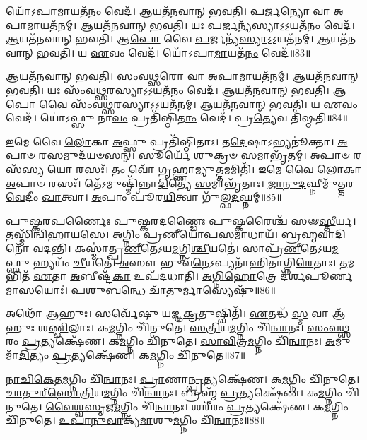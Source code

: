 𑌯𑍋᳴𑌽𑌪𑌾\-\ul{𑌮𑌾}\-𑌯𑌤᳴\-\ul{𑌨𑌂} 𑌵𑍇𑌦᳴। \ul{𑌆}\-𑌯𑌤᳴𑌨𑌵𑌾𑌨𑍍‌ 𑌭𑌵𑌤𑌿।
\-\ul{𑌪}\-𑌰𑍍𑌜\-\ul{𑌨𑍍𑌯𑍋} 𑌵𑌾 \ul{𑌅}\-𑌪𑌾\-\ul{𑌮𑌾}\-𑌯𑌤᳴𑌨𑌮𑍍। \ul{𑌆}\-𑌯𑌤᳴𑌨𑌵𑌾𑌨𑍍‌ 𑌭𑌵𑌤𑌿। 
𑌯𑌃 \ul{𑌪}\-𑌰𑍍𑌜𑌨𑍍𑌯᳴\-\ul{𑌸𑍍𑌯𑌾}\-𑌽॒𑌽॒𑌯𑌤᳴\-\ul{𑌨𑌂} 𑌵𑍇𑌦᳴। \ul{𑌆}\-𑌯𑌤᳴𑌨𑌵𑌾𑌨𑍍‌ 𑌭𑌵𑌤𑌿। 
𑌆\-\ul{𑌪𑍋} 𑌵𑍈 \ul{𑌪}\-𑌰𑍍𑌜𑌨𑍍𑌯᳴\-\ul{𑌸𑍍𑌯𑌾}\-𑌽॒𑌽॒𑌯𑌤᳴𑌨𑌮𑍍। \ul{𑌆}\-𑌯𑌤᳴𑌨𑌵𑌾𑌨𑍍‌ 𑌭𑌵𑌤𑌿। 
𑌯 \ul{𑌏}\-𑌵𑌂 𑌵𑍇𑌦᳴। 𑌯𑍋᳴𑌽𑌪𑌾\-\ul{𑌮𑌾}\-𑌯𑌤᳴\-\ul{𑌨𑌂} 𑌵𑍇𑌦᳴॥83॥


\-\ul{𑌆}\-𑌯𑌤᳴𑌨𑌵𑌾𑌨𑍍‌ 𑌭𑌵𑌤𑌿। \ul{𑌸𑌂}\-\-\ul{𑌵}\-\-\ul{𑌥𑍍𑌸}\-𑌰𑍋 𑌵𑌾 \ul{𑌅}\-𑌪𑌾\-\ul{𑌮𑌾}\-𑌯𑌤᳴𑌨𑌮𑍍। 
\-\ul{𑌆}\-𑌯𑌤᳴𑌨𑌵𑌾𑌨𑍍‌ 𑌭𑌵𑌤𑌿। 𑌯𑌃 𑌸𑌂᳴𑌵\-\ul{𑌥𑍍𑌸}\-𑌰\-\ul{𑌸𑍍𑌯𑌾}\-𑌽॒𑌽॒𑌯𑌤᳴\-\ul{𑌨𑌂} 𑌵𑍇𑌦᳴। 
\-\ul{𑌆}\-𑌯𑌤᳴𑌨𑌵𑌾𑌨𑍍‌ 𑌭𑌵𑌤𑌿। 𑌆\-\ul{𑌪𑍋} 𑌵𑍈 𑌸𑌂᳴𑌵\-\ul{𑌥𑍍𑌸}\-𑌰\-\ul{𑌸𑍍𑌯𑌾}\-𑌽॒𑌽॒𑌯𑌤᳴𑌨𑌮𑍍। 
\-\ul{𑌆}\-𑌯𑌤᳴𑌨𑌵𑌾𑌨𑍍‌ 𑌭𑌵𑌤𑌿। 𑌯 \ul{𑌏}\-𑌵𑌂 𑌵𑍇𑌦᳴। 
𑌯𑍋॑𑌽𑌫𑍍𑌸𑍁 𑌨𑌾\-\ul{𑌵𑌂} 𑌪𑍍𑌰𑌤𑌿᳴𑌷𑍍𑌠𑌿\-\ul{𑌤𑌾𑌂} 𑌵𑍇𑌦᳴। 𑌪𑍍𑌰\-\ul{𑌤𑍍𑌯𑍇}\-𑌵 𑌤𑌿᳴𑌷𑍍𑌠𑌤𑌿॥84॥


\-\ul{𑌇}\-𑌮𑍇 𑌵𑍈 \ul{𑌲𑍋}\-𑌕𑌾 \ul{𑌅}\-𑌫𑍍𑌸𑍁 𑌪𑍍𑌰𑌤𑌿᳴𑌷𑍍𑌠𑌿𑌤𑌾𑌃। 𑌤\-\ul{𑌦𑍇}\-𑌷𑌾𑌽𑌭𑍍𑌯𑌨𑍂॑𑌕𑍍𑌤𑌾। 
\-\ul{𑌅}\-𑌪𑌾𑍞 𑌰\-\ul{𑌸}\-𑌮𑍁𑌦᳴𑌯𑍞𑌸𑌨𑍍। 𑌸𑍂𑌰𑍍𑌯𑍇᳴ \ul{𑌶𑍁}\-𑌕𑍍𑌰𑍞 \ul{𑌸}\-𑌮𑌾𑌭𑍃᳴𑌤𑌮𑍍। 
\-\ul{𑌅}\-𑌪𑌾𑍞 𑌰𑌸᳴\-\ul{𑌸𑍍𑌯} 𑌯𑍋 𑌰𑌸𑌃᳴। 𑌤𑌂 𑌵𑍋᳴ 𑌗𑍃𑌹𑍍𑌣𑌾𑌮𑍍𑌯𑍁\-\ul{𑌤𑍍𑌤}\-𑌮𑌮𑌿𑌤𑌿᳴। 
\-\ul{𑌇}\-𑌮𑍇 𑌵𑍈 \ul{𑌲𑍋}\-𑌕𑌾 \ul{𑌅}\-𑌪𑌾𑍞 𑌰𑌸𑌃᳴। 𑌤𑍇᳴𑌽𑌮𑍁𑌷𑍍𑌮𑌿᳴𑌨𑍍𑌨𑌾\-\ul{𑌦𑌿}\-𑌤𑍍𑌯𑍇 \ul{𑌸}\-𑌮𑌾𑌭𑍃᳴𑌤𑌾𑌃। 
\-\ul{𑌜𑌾}\-\-\ul{𑌨𑍁}\-\-\ul{𑌦}\-𑌘𑍍𑌨𑍀𑌮𑍁᳴𑌤𑍍𑌤𑌰\-\-\ul{𑌵𑍇}\-𑌦𑍀𑌂 \ul{𑌖𑌾}\-𑌤𑍍𑌵𑌾। \ul{𑌅}\-𑌪𑌾𑌂 𑌪𑍂᳴𑌰\-\ul{𑌯𑌿}\-𑌤𑍍𑌵𑌾 𑌗𑍁᳴𑌲𑍍𑌫\-\ul{𑌦}\-𑌘𑍍𑌨𑌮𑍍॥85॥


𑌪𑍁𑌷𑍍𑌕𑌰𑌪𑌰𑍍𑌣𑍈𑌃 𑌪𑍁𑌷𑍍𑌕𑌰𑌦𑌣𑍍𑌡𑍈𑌃 𑌪𑍁𑌷𑍍𑌕𑌰𑍈𑌶𑍍𑌚᳴ 𑌸𑍟\-\ul{𑌸𑍍𑌤𑍀}\-𑌰𑍍𑌯। 𑌤𑌸𑍍𑌮𑌿᳴𑌨𑍍𑌵𑌿\-\-\ul{𑌹𑌾}\-𑌯𑌸𑍇। 
\-\ul{𑌅}\-𑌗𑍍𑌨𑌿𑌂 \ul{𑌪𑍍𑌰}\-𑌣𑍀𑌯𑍋᳴𑌪𑌸\-\ul{𑌮𑌾}\-𑌧𑌾𑌯᳴। \ul{𑌬𑍍𑌰}\-\-\ul{𑌹𑍍𑌮}\-\-\ul{𑌵𑌾}\-𑌦𑌿𑌨𑍋᳴ 𑌵𑌦𑌨𑍍𑌤𑌿। 
𑌕𑌸𑍍𑌮𑌾॑𑌤𑍍𑌪𑍍𑌰\-\ul{𑌣𑍀}\-𑌤𑍇\-𑌽𑌯\-\ul{𑌮}\-𑌗𑍍𑌨𑌿\-\ul{𑌶𑍍𑌚𑍀}\-𑌯𑌤𑍇॑। 𑌸𑌾𑌪𑍍𑌰᳴\-\ul{𑌣𑍀}\-𑌤𑍇𑌽𑌯\-\ul{𑌮}\-𑌫𑍍𑌸𑍁 𑌹𑍍𑌯𑌯𑌂᳴ \ul{𑌚𑍀}\-𑌯𑌤𑍇॑। 
\-\ul{𑌅}\-𑌸𑍗 𑌭𑍁𑌵᳴\-\ul{𑌨𑍇}\-𑌽𑌪𑍍𑌯𑌨𑌾᳴𑌹𑌿𑌤𑌾𑌗𑍍𑌨𑌿\-\ul{𑌰𑍇}\-𑌤𑌾𑌃। 𑌤\-\ul{𑌮}\-𑌭𑌿𑌤᳴ \ul{𑌏}\-𑌤𑌾 \ul{𑌅}\-𑌬𑍀𑌷𑍍𑌟᳴\-\ul{𑌕𑌾} 𑌉𑌪᳴𑌦𑌧𑌾𑌤𑌿। 
\-\ul{𑌅}\-\-\ul{𑌗𑍍𑌨𑌿}\-\-\ul{𑌹𑍋}\-𑌤𑍍𑌰𑍇 𑌦᳴𑌰𑍍𑌶𑌪𑍂𑌰𑍍𑌣\-\ul{𑌮𑌾}\-𑌸𑌯𑍋𑌃॑। \ul{𑌪}\-\-\ul{𑌶𑍁}\-\-\ul{𑌬}\-𑌨𑍍𑌧𑍇 𑌚𑌾᳴𑌤𑍁\-\ul{𑌰𑍍𑌮𑌾}\-𑌸𑍍𑌯𑍇𑌷𑍁᳴॥86॥


𑌅𑌥𑍋᳴ 𑌆𑌹𑍁𑌃। 𑌸𑌰𑍍𑌵𑍇᳴𑌷𑍁 𑌯𑌜𑍍𑌞\-\ul{𑌕𑍍𑌰}\-𑌤𑍁𑌷𑍍𑌵𑌿𑌤𑌿᳴। 
\-\ul{𑌏}\-𑌤𑌦𑍍𑌧᳴ \ul{𑌸𑍍𑌮} 𑌵𑌾 𑌆᳴𑌹𑍁𑌃 𑌶\-\ul{𑌣𑍍𑌡𑌿}\-𑌲𑌾𑌃। 𑌕\-\ul{𑌮}\-𑌗𑍍𑌨𑌿𑌂 𑌚𑌿᳴𑌨𑍁𑌤𑍇। 
\-\ul{𑌸}\-\-\ul{𑌤𑍍𑌰𑌿}\-𑌯\-\ul{𑌮}\-𑌗𑍍𑌨𑌿𑌂 𑌚𑌿᳴\-\ul{𑌨𑍍𑌵𑌾}\-𑌨𑌃। \ul{𑌸𑌂}\-\-\ul{𑌵}\-\-\ul{𑌥𑍍𑌸}\-𑌰𑌂 \ul{𑌪𑍍𑌰}\-𑌤𑍍𑌯𑌕𑍍𑌷𑍇᳴𑌣। 
𑌕\-\ul{𑌮}\-𑌗𑍍𑌨𑌿𑌂 𑌚𑌿᳴𑌨𑍁𑌤𑍇। \ul{𑌸𑌾}\-\-\ul{𑌵𑌿}\-𑌤𑍍𑌰\-\ul{𑌮}\-𑌗𑍍𑌨𑌿𑌂 𑌚𑌿᳴\-\ul{𑌨𑍍𑌵𑌾}\-𑌨𑌃। 
\-\ul{𑌅}\-𑌮𑍁𑌮𑌾᳴\-\ul{𑌦𑌿}\-𑌤𑍍𑌯𑌂 \ul{𑌪𑍍𑌰}\-𑌤𑍍𑌯𑌕𑍍𑌷𑍇᳴𑌣। 𑌕\-\ul{𑌮}\-𑌗𑍍𑌨𑌿𑌂 𑌚𑌿᳴𑌨𑍁𑌤𑍇॥87॥


\-\ul{𑌨𑌾}\-\-\ul{𑌚𑌿}\-\-\ul{𑌕𑍇}\-𑌤\-\ul{𑌮}\-𑌗𑍍𑌨𑌿𑌂 𑌚𑌿᳴\-\ul{𑌨𑍍𑌵𑌾}\-𑌨𑌃। 
\-\ul{𑌪𑍍𑌰𑌾}\-𑌣𑌾\-\ul{𑌨𑍍𑌪𑍍𑌰}\-𑌤𑍍𑌯𑌕𑍍𑌷𑍇᳴𑌣। 𑌕\-\ul{𑌮}\-𑌗𑍍𑌨𑌿𑌂 𑌚𑌿᳴𑌨𑍁𑌤𑍇। \ul{𑌚𑌾}\-\-\ul{𑌤𑍁}\-\ul{𑌰𑍍}‌\-\ul{𑌹𑍋}\-\-\ul{𑌤𑍍𑌰𑌿}\-𑌯\-\-\ul{𑌮}\-𑌗𑍍𑌨𑌿𑌂 𑌚𑌿᳴\-\ul{𑌨𑍍𑌵𑌾}\-𑌨𑌃। 
𑌬𑍍𑌰𑌹𑍍𑌮᳴ \ul{𑌪𑍍𑌰}\-𑌤𑍍𑌯𑌕𑍍𑌷𑍇᳴𑌣। 𑌕\-\ul{𑌮}\-𑌗𑍍𑌨𑌿𑌂 𑌚𑌿᳴𑌨𑍁𑌤𑍇। \ul{𑌵𑍈}\-\-\ul{𑌶𑍍𑌵}\-\-\ul{𑌸𑍃}\-𑌜\-\ul{𑌮}\-𑌗𑍍𑌨𑌿𑌂 𑌚𑌿᳴\-\ul{𑌨𑍍𑌵𑌾}\-𑌨𑌃। 
𑌶𑌰𑍀᳴𑌰𑌂 \ul{𑌪𑍍𑌰}\-𑌤𑍍𑌯𑌕𑍍𑌷𑍇᳴𑌣। 𑌕\-\ul{𑌮}\-𑌗𑍍𑌨𑌿𑌂 𑌚𑌿᳴𑌨𑍁𑌤𑍇। \ul{𑌉}\-\-\ul{𑌪𑌾}\-\-\ul{𑌨𑍁}\-\-\ul{𑌵𑌾}\-𑌕𑍍𑌯᳴\-\-\ul{𑌮𑌾}\-𑌶𑍁\-\ul{𑌮}\-𑌗𑍍𑌨𑌿𑌂 𑌚𑌿᳴\-\ul{𑌨𑍍𑌵𑌾}\-𑌨𑌃॥88॥


